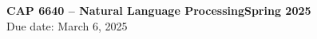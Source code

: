 \documentclass[10pt]{article}
\begin{document}
\noindent \textbf{CAP 6640 -- Natural Language Processing\hspace*{\fill}Spring 2025}\\
 \hfill Due date: March 6, 2025

\end{document}
